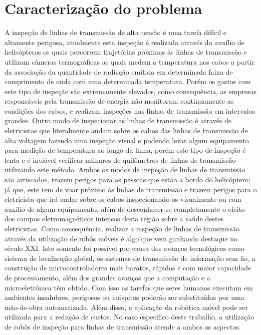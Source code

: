 \chapter{Caracterização do problema}
A inspeção de linhas de transmissão de alta tensão é uma tarefa difícil e altamente perigosa, atualmente esta inspeção é realizada através do auxílio de helicópteros os quais percorrem trajetórias próximas às linhas de transmissão e utilizam câmeras termográficas as quais medem a temperatura nos cabos a partir da associação da quantidade de radiação emitida em determinada faixa de comprimento de onda com uma determinada temperatura. Porém os gastos com este tipo de inspeção são extremamente elevados, como consequência, as empresas responsáveis pela transmissão de energia não monitoram continuamente as condições dos cabos, e realizam inspeções nas linhas de transmissão em intervalos grandes. Outro modo de inspecionar as linhas de transmissão é através de eletricistas que literalmente andam sobre os cabos das linhas de transmissão de alta voltagem fazendo uma inspeção visual e podendo levar algum equipamento para medição de temperatura ao longo da linha, porém este tipo de inspeção é lenta e é inviável verificar milhares de quilômetros de linhas de transmissão utilizando este método.
Ambos os modos de inspeção de linhas de transmissão são arriscados, trazem perigos para as pessoas que estão a bordo do helicóptero; já que, este tem de voar próximo às linhas de transmissão e trazem perigos para o eletricista que irá andar sobre os cabos inspecionando-os visualmente ou com auxílio de algum equipamento, além de desconhecer-se completamente o efeito dos campos eletromagnéticos intensos desta região sobre a saúde destes eletricistas. Como consequência, realizar a inspeção de linhas de transmissão através da utilização de robôs móveis é algo que vem ganhando destaque no século XXI. Isto somente foi possível por causa dos avanços tecnológicos como sistema de localização global, os sistemas de transmissão de informação sem fio, a construção de microcontroladores mais baratos, rápidos e com maior capacidade de processamento, além dos grandes avanços que a computação e a microeletrônica têm obtido. Com isso as tarefas que seres humanos executam em ambientes insalubres, perigosos ou inóspitos poderão ser substituídas por uma mão-de-obra automatizada. Além disso, a aplicação da robótica móvel pode ser utilizada para a redução de custos.  No caso específico deste trabalho, a utilização de robôs de inspeção para linhas de transmissão atende a ambos os aspectos.
